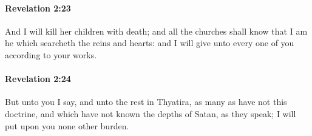		\paragraph{Revelation 2:23} %
			\label{REVELATIONNT-2-23}

			And I will kill her children with death; and all the churches shall know that I am he which searcheth the reins and hearts: and I will give unto every one of you according to your works.

			\begin{framed}
			\scriptsize
				\begin{compactdesc}
					\item[SBLG]  \hyperref[ERAUNAO]{} 
				\end{compactdesc}
			\end{framed}

		\paragraph{Revelation 2:24} %
			\label{REVELATIONNT-2-24}

			But unto you I say, and unto the rest in Thyatira, as many as have not this doctrine, and which have not known the depths of Satan, as they speak; I will put upon you none other burden.

